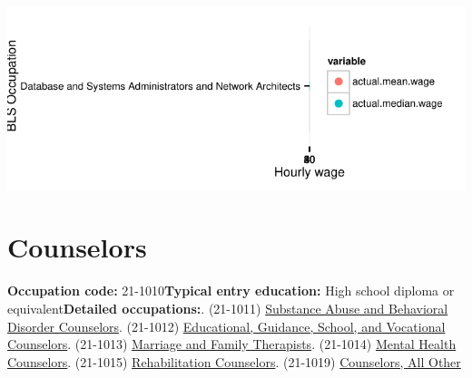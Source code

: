 \documentclass[a4paper,10pt]{article}\usepackage[]{graphicx}\usepackage[]{color}
\makeatletter
\def\maxwidth{ %
  \ifdim\Gin@nat@width>\linewidth
    \linewidth
  \else
    \Gin@nat@width
  \fi
}
\makeatother
\begin{document}
{\centering \includegraphics[width=\maxwidth]{figure/unnamed-chunk-250} 

}


\newpage\section{Counselors}\textbf{Occupation code:} 21-1010\newline\textbf{Typical entry education:} High school diploma or equivalent\newline\textbf{Detailed occupations:}. (21-1011)  \href{http://www.bls.gov/oes/current/oes211011.htm}{Substance Abuse and Behavioral Disorder Counselors}. (21-1012)  \href{http://www.bls.gov/oes/current/oes211012.htm}{Educational, Guidance, School, and Vocational Counselors}. (21-1013)  \href{http://www.bls.gov/oes/current/oes211013.htm}{Marriage and Family Therapists}. (21-1014)  \href{http://www.bls.gov/oes/current/oes211014.htm}{Mental Health Counselors}. (21-1015)  \href{http://www.bls.gov/oes/current/oes211015.htm}{Rehabilitation Counselors}. (21-1019)  \href{http://www.bls.gov/oes/current/oes211019.htm}{Counselors, All Other}\newline%
\end{document}
